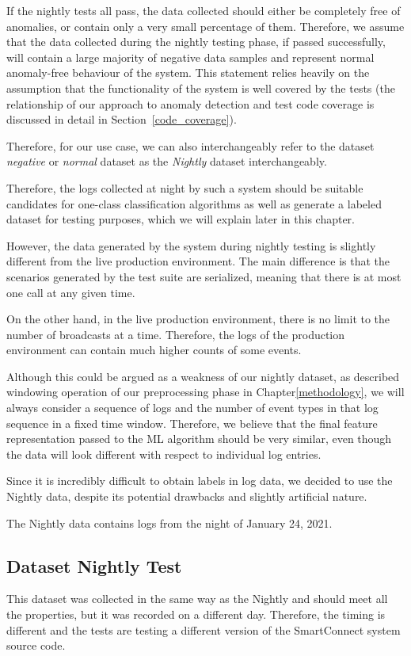 If the nightly tests all pass, the data collected should either be completely free of anomalies, or contain only a very small percentage of them. 
Therefore, we assume that the data collected during the nightly testing phase, if passed successfully, will contain a large majority of negative data samples and represent normal anomaly-free behaviour of the system. This statement relies heavily on the assumption that the functionality of the system is well covered by the tests (the relationship of our approach to anomaly detection and test code coverage is discussed in detail in Section~\ref{code_coverage}). 

Therefore, for our use case, we can also interchangeably refer to the dataset \textit{negative} or \textit{normal} dataset as the \textit{Nightly} dataset interchangeably.

Therefore, the logs collected at night by such a system should be suitable candidates for one-class classification algorithms as well as generate a labeled dataset for testing purposes, which we will explain later in this chapter.

However, the data generated by the system during nightly testing is slightly different from the live production environment. The main difference is that the scenarios generated by the test suite are serialized, meaning that there is at most one call at any given time. 

On the other hand, in the live production environment, there is no limit to the number of broadcasts at a time. Therefore, the logs of the production environment can contain much higher counts of some events.

Although this could be argued as a weakness of our nightly dataset, as described windowing operation of our preprocessing phase in Chapter\ref{methodology}, we will always consider a sequence of logs and the number of event types in that log sequence in a fixed time window. Therefore, we believe that the final feature representation passed to the ML algorithm should be very similar, even though the data will look different with respect to individual log entries.

Since it is incredibly difficult to obtain labels in log data, we decided to use the Nightly data, despite its potential drawbacks and slightly artificial nature.

The Nightly data contains logs from the night of January 24, 2021.

\subsection{Dataset Nightly Test}
This dataset was collected in the same way as the Nightly and should meet all the properties, but it was recorded on a different day. Therefore, the timing is different and the tests are testing a different version of the SmartConnect system source code.

